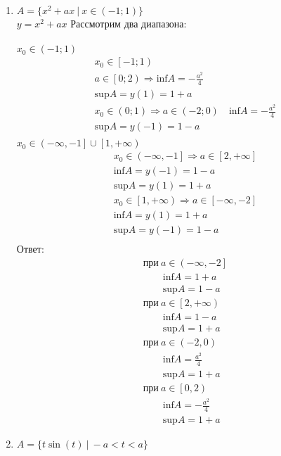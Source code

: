 		\begin{enumerate}
		\item $A = \{x^2 + ax\ |\ x \in ( - 1; 1) \}$\\
			$y = x^2 + ax$
			Рассмотрим два диапазона:\\
			\\
			$x_0 \in ( - 1; 1)$\\
			\begin{gather*}
				x_0 \in \left[ - 1; 1\right)\\
				a \in \left[0; 2\right) \Rightarrow \text{inf} A = - \frac{a^2}{4}\\
				\text{sup} A = y(1) = 1 + a\\
				x_0 \in \left(0; 1\right) \Rightarrow a \in \left( - 2; 0\right)\quad \text{inf} A = - \frac{a^2}{4}\\
				\text{sup} A = y( - 1) = 1 - a\\
			\end{gather*}
			$x_0 \in \left( - \infty, - 1 \right] \cup \left[ 1, + \infty \right)$\\
			\begin{gather*}
				x_0 \in \left( - \infty, - 1 \right] \Rightarrow a \in \left[ 2, + \infty \right]\\
				\text{inf} A = y( - 1) = 1 - a\\
				\text{sup} A = y(1) = 1 + a\\
				x_0 \in \left[ 1, + \infty \right) \Rightarrow a \in \left[ - \infty, - 2 \right]\\
				\text{inf} A = y(1) = 1 + a\\
				\text{sup} A = y( - 1) = 1 - a\\
			\end{gather*}
			Ответ:
			\begin{gather*}
				\text{при}\ a \in \left( - \infty, - 2 \right]\\
				\qquad \text{inf} A = 1 + a\\
				\qquad \text{sup} A = 1 - a\\
				\text{при}\ a \in \left[ 2, + \infty \right)\\
				\qquad \text{inf} A = 1 - a\\
				\qquad \text{sup} A = 1 + a\\
				\text{при}\ a \in \left( - 2, 0 \right)\\
				\qquad \text{inf} A = \frac{a^2}{4}\\
				\qquad \text{sup} A = 1 + a\\
				\text{при}\ a \in \left[ 0,2 \right)\\
				\qquad \text{inf} A = - \frac{a^2}{4}\\
				\qquad \text{sup} A = 1 + a
			\end{gather*}
		\item $A = \{t \sin(t)\ |\ - a<t<a \}$\\		
		

\end{enumerate}

